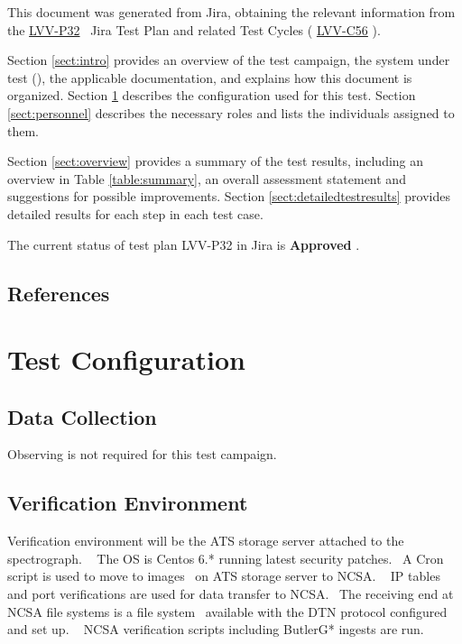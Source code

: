 \documentclass[DM,lsstdraft,STR,toc]{lsstdoc}
\begin{document}
This document was generated from Jira, obtaining the relevant information from the 
\href{https://jira.lsstcorp.org/secure/Tests.jspa#/testPlan/LVV-P32}{LVV-P32}
~Jira Test Plan and related Test Cycles (
  \href{https://jira.lsstcorp.org/secure/Tests.jspa#/testCycle/LVV-C56}{LVV-C56}
).

Section \ref{sect:intro} provides an overview of the test campaign, the system under test (\product{}), the applicable documentation, and explains how this document is organized.
Section \ref{sect:configuration}  describes the configuration used for this test.
Section \ref{sect:personnel} describes the necessary roles and lists the individuals assigned to them.

Section \ref{sect:overview} provides a summary of the test results, including an overview in Table \ref{table:summary}, an overall assessment statement and suggestions for possible improvements.
Section \ref{sect:detailedtestresults} provides detailed results for each step in each test case.

The current status of test plan LVV-P32 in Jira is \textbf{ Approved }.

\subsection{References}
\label{sect:references}
\renewcommand{\refname}{}

\section{Test Configuration}
\label{sect:configuration}

\subsection{Data Collection}

  Observing is not required for this test campaign.

\subsection{Verification Environment}
\label{sect:hwconf}
  Verification environment will be the ATS storage server attached to the
spectrograph. ~ The OS is Centos 6.* running latest security patches. ~A
Cron script is used to move to images ~on ATS storage server to NCSA. ~
IP tables and port verifications are used for data transfer to NCSA.
~The receiving end at NCSA file systems is a file system ~available with
the DTN protocol configured and set up. ~ NCSA verification scripts
including ButlerG* ingests are run. ~\\[3\baselineskip]
\end{document}
